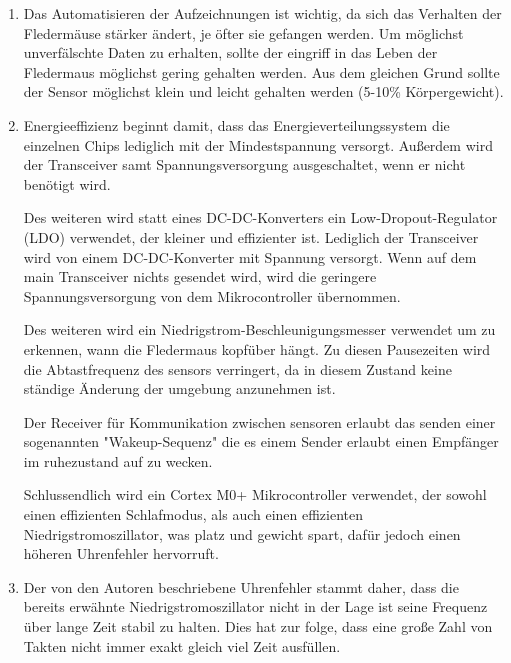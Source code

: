

\date{Sonntag, 17.05.2020}


    \maketitle
    \thispagestyle{fancy}


    \begin{enumerate}
        \item Das Automatisieren der Aufzeichnungen ist wichtig, da sich das Verhalten der Fledermäuse stärker ändert, je öfter sie gefangen werden. Um möglichst unverfälschte Daten zu erhalten, sollte der eingriff in das Leben der Fledermaus möglichst gering gehalten werden. Aus dem gleichen Grund sollte der Sensor möglichst klein und leicht gehalten werden (5-10\% Körpergewicht).

        \item Energieeffizienz beginnt damit, dass das Energieverteilungssystem die einzelnen Chips lediglich mit der Mindestspannung versorgt. Außerdem wird der Transceiver samt Spannungsversorgung ausgeschaltet, wenn er nicht benötigt wird.

        Des weiteren wird statt eines DC-DC-Konverters ein Low-Dropout-Regulator (LDO) verwendet, der kleiner und effizienter ist. Lediglich der Transceiver wird von einem DC-DC-Konverter mit Spannung versorgt. Wenn auf dem main Transceiver nichts gesendet wird, wird die geringere Spannungsversorgung von dem Mikrocontroller übernommen.

        Des weiteren wird ein Niedrigstrom-Beschleunigungs\-messer verwendet um zu erkennen, wann die Fledermaus kopfüber hängt. Zu diesen Pausezeiten wird die Abtastfrequenz des sensors verringert, da in diesem Zustand keine ständige Änderung der umgebung anzunehmen ist.

        Der Receiver für Kommunikation zwischen sensoren erlaubt das senden einer sogenannten "Wakeup-Sequenz" die es einem Sender erlaubt einen Empfänger im ruhezustand auf zu wecken.

        Schlussendlich wird ein Cortex M0+ Mikrocontroller verwendet, der sowohl einen effizienten Schlafmodus, als auch einen effizienten Niedrigstromoszillator, was platz und gewicht spart, dafür jedoch einen höheren Uhrenfehler hervorruft.

        \item Der von den Autoren beschriebene Uhrenfehler stammt daher, dass die bereits erwähnte Niedrigstromoszillator nicht in der Lage ist seine Frequenz über lange Zeit stabil zu halten. Dies hat zur folge, dass eine große Zahl von Takten nicht immer exakt gleich viel Zeit ausfüllen.


\end{enumerate}
